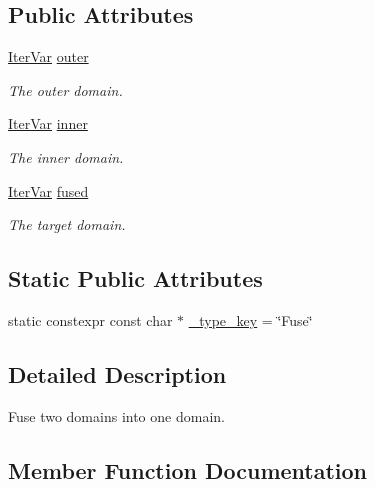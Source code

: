 \subsection*{Public Attributes}
\begin{DoxyCompactItemize}
\item 
\hyperlink{classtvm_1_1tir_1_1IterVar}{Iter\+Var} \hyperlink{classtvm_1_1te_1_1FuseNode_a90efca7f5397eb34989f5d085ae9bab5}{outer}
\begin{DoxyCompactList}\small\item\em The outer domain. \end{DoxyCompactList}\item 
\hyperlink{classtvm_1_1tir_1_1IterVar}{Iter\+Var} \hyperlink{classtvm_1_1te_1_1FuseNode_a5a867854c20179cd32b19fb1eab90616}{inner}
\begin{DoxyCompactList}\small\item\em The inner domain. \end{DoxyCompactList}\item 
\hyperlink{classtvm_1_1tir_1_1IterVar}{Iter\+Var} \hyperlink{classtvm_1_1te_1_1FuseNode_ad5abaac8d77c9c88ec374ae91d68cb88}{fused}
\begin{DoxyCompactList}\small\item\em The target domain. \end{DoxyCompactList}\end{DoxyCompactItemize}
\subsection*{Static Public Attributes}
\begin{DoxyCompactItemize}
\item 
static constexpr const char $\ast$ \hyperlink{classtvm_1_1te_1_1FuseNode_aea440c46ab4280ddf181bb88c258d279}{\+\_\+type\+\_\+key} = \char`\"{}Fuse\char`\"{}
\end{DoxyCompactItemize}


\subsection{Detailed Description}
Fuse two domains into one domain. 

\subsection{Member Function Documentation}
